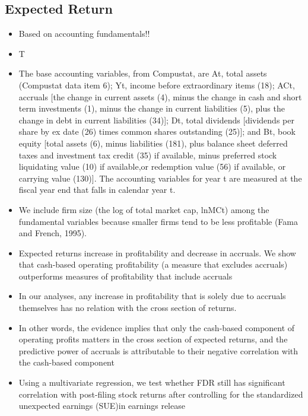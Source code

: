 \documentclass[12pt]{article}
\begin{document}
\subsection{Expected Return}    

    \begin{itemize}

        \item Based on accounting fundamentals!! 

        \item T

        \item The base accounting variables, from Compustat, are At, total assets (Compustat data item 6); Yt, income before extraordinary items (18); ACt, accruals [the change in current assets (4), minus the change in cash and short term investments (1), minus the change in current liabilities (5), plus the change in debt in current liabilities (34)]; Dt, total dividends [dividends per share by ex date (26) times common shares outstanding (25)]; and Bt, book equity  [total assets (6), minus liabilities (181), plus balance sheet deferred taxes and investment tax credit (35) if available, minus preferred stock liquidating value (10) if available,or redemption value (56) if available, or carrying value (130)]. The accounting variables for year t are measured at the fiscal year end that falls in calendar year t. \citep{Fama2006}

        \item We include firm size (the log of total market cap, lnMCt) among the fundamental variables because smaller firms tend to be less profitable (Fama and French, 1995).\citep{Fama2006}

        \item Expected returns increase in profitability and decrease in accruals. We show that cash-based operating profitability (a measure that excludes accruals) outperforms measures of profitability that include accruals \citep{Ball2016}

        \item In our analyses, any increase in profitability that is solely due to accruals themselves has no relation with the cross section of returns.\citep{Ball2016}

        \item In other words, the evidence implies that only the cash-based component of operating profits matters in the cross section of expected returns, and the predictive power of accruals is attributable to their negative correlation with the cash-based component \citep{Ball2016}
       
        \item Using a multivariate regression, we test whether FDR still has significant correlation with post-filing stock returns after controlling for the standardized unexpected earnings (SUE)in earnings release \citep{You2009}

    \end{itemize}
\end{document}
